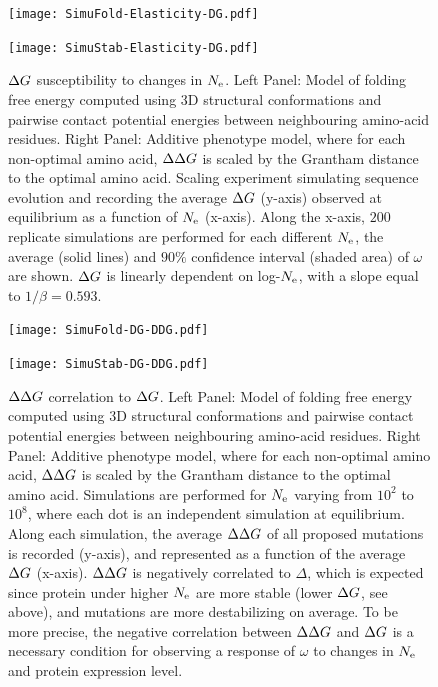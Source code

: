 \begin{figure}[H]
	\centering
	\begin{minipage}{0.49\linewidth}
		\texttt{[image: SimuFold-Elasticity-DG.pdf]}
	\end{minipage}%
	\hfill
	\begin{minipage}{0.49\linewidth}
		\texttt{[image: SimuStab-Elasticity-DG.pdf]}
	\end{minipage}
	\caption[$\DeltaG$ susceptibility to changes in $\Ne$]{
		$\DeltaG$ susceptibility to changes in $\Ne$.
		Left Panel: Model of folding free energy computed using 3D structural conformations and pairwise contact potential energies between neighbouring amino-acid residues. 
		Right Panel: Additive phenotype model, where for each non-optimal amino acid, $\DeltaDeltaG$ is scaled by the Grantham distance to the optimal amino acid.
		Scaling experiment simulating sequence evolution and recording the average $\DeltaG$ (y-axis) observed at equilibrium as a function of $\Ne$ (x-axis).
		Along the x-axis, $200$ replicate simulations are performed for each different $\Ne$, the average (solid lines) and $90\%$ confidence interval (shaded area) of $\omega$ are shown.
		$\DeltaG$ is linearly dependent on log-$\Ne$, with a slope equal to $1/\beta=0.593$.
	}
\end{figure}

\begin{figure}[H]
	\centering
	\begin{minipage}{0.49\linewidth}
		\texttt{[image: SimuFold-DG-DDG.pdf]}
	\end{minipage}%
	\hfill
	\begin{minipage}{0.49\linewidth}
		\texttt{[image: SimuStab-DG-DDG.pdf]}
	\end{minipage}

	\caption[$\DeltaDeltaG$ correlation to $\DeltaG$]{
		$\DeltaDeltaG$ correlation to $\DeltaG$.
		Left Panel: Model of folding free energy computed using 3D structural conformations and pairwise contact potential energies between neighbouring amino-acid residues. 
		Right Panel: Additive phenotype model, where for each non-optimal amino acid, $\DeltaDeltaG$ is scaled by the Grantham distance to the optimal amino acid.
		Simulations are performed for $\Ne$ varying from $10^2$ to $10^8$, where each dot is an independent simulation at equilibrium.
		Along each simulation, the average $\DeltaDeltaG$ of all proposed mutations is recorded (y-axis), and represented as a function of the average $\DeltaG$ (x-axis).
		$\DeltaDeltaG$ is negatively correlated to $\Delta$, which is expected since protein under higher $\Ne$ are more stable (lower $\DeltaG$, see above), and mutations are more destabilizing on average.
		To be more precise, the negative correlation between $\DeltaDeltaG$ and $\DeltaG$ is a necessary condition for observing a response of $\omega$ to changes in $\Ne$ and protein expression level\citep{Serohijos2012, Goldstein2013}. 
	}
\end{figure}

